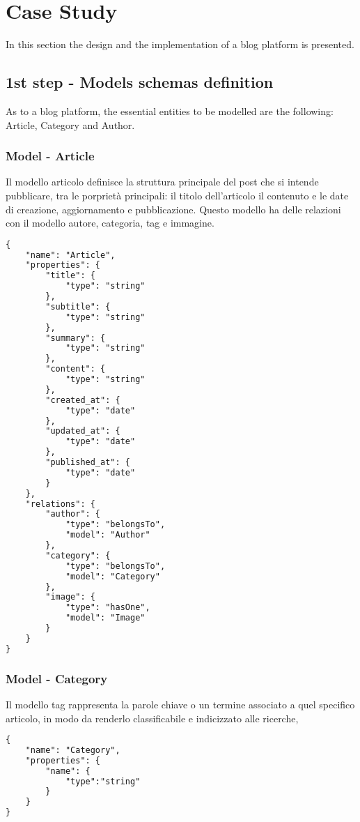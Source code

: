 \section{Case Study}
\label{sec:CAS_castudy}

In this section the design and the implementation of a blog platform is presented.

\subsection{1st step - Models schemas definition}

As to a blog platform, the essential entities to be modelled are the following: Article, Category and Author.

\subsubsection{Model - Article}

Il modello articolo definisce la struttura principale del post che si intende pubblicare, tra le porprietà principali: il titolo dell'articolo il contenuto e le date di  creazione, aggiornamento e pubblicazione. Questo modello ha delle relazioni con il modello autore, categoria, tag e immagine.

\begin{lstlisting}[language=html]
{
	"name": "Article",
	"properties": {
		"title": {
      		"type": "string"
    	},
    	"subtitle": {
      		"type": "string"
    	},
    	"summary": {
      		"type": "string"
    	},
    	"content": {
      		"type": "string"
    	},
    	"created_at": {
      		"type": "date"
    	},
    	"updated_at": {
      		"type": "date"
    	},
    	"published_at": {
      		"type": "date"
    	}
  	},
	"relations": {
    	"author": {
      		"type": "belongsTo",
      		"model": "Author"
    	},
    	"category": {
      		"type": "belongsTo",
      		"model": "Category"
    	},
    	"image": {
      		"type": "hasOne",
      		"model": "Image"
    	}
    }
}
\end{lstlisting}
\subsubsection{Model - Category}

Il modello tag rappresenta la parole chiave o un termine associato a quel specifico articolo, in modo da renderlo classificabile e indicizzato alle ricerche,

\begin{lstlisting}[language=html]
{
	"name": "Category",
	"properties": {
		"name": {
			"type":"string"
		}
	}
}
\end{lstlisting}
